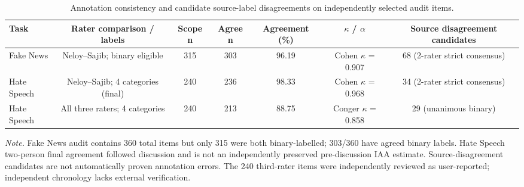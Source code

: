 \begin{table}[t]
\centering
\caption{Annotation consistency and candidate source-label disagreements on independently selected audit items.}
\label{tab:human_iaa}
\footnotesize
\begin{adjustbox}{max width=\linewidth}
\begin{tabular}{lcccccc}
\toprule
Task & Rater comparison / labels & Scope n & Agree n & Agreement (\%) & $\kappa$ / $\alpha$ & Source disagreement candidates \\
\midrule
Fake News & Neloy--Sajib; binary eligible & 315 & 303 & 96.19 & Cohen $\kappa$ = 0.907 & 68 (2-rater strict consensus) \\
Hate Speech & Neloy--Sajib; 4 categories (final) & 240 & 236 & 98.33 & Cohen $\kappa$ = 0.968 & 34 (2-rater strict consensus) \\
Hate Speech & All three raters; 4 categories & 240 & 213 & 88.75 & Conger $\kappa$ = 0.858 & 29 (unanimous binary) \\
\bottomrule
\end{tabular}
\end{adjustbox}
\par\vspace{2pt}
\begin{minipage}{\linewidth}
\scriptsize\emph{Note.} Fake News audit contains 360 total items but only 315 were both binary-labelled; 303/360 have agreed binary labels. Hate Speech two-person final agreement followed discussion and is not an independently preserved pre-discussion IAA estimate. Source-disagreement candidates are not automatically proven annotation errors. The 240 third-rater items were independently reviewed as user-reported; independent chronology lacks external verification.
\end{minipage}
\end{table}
